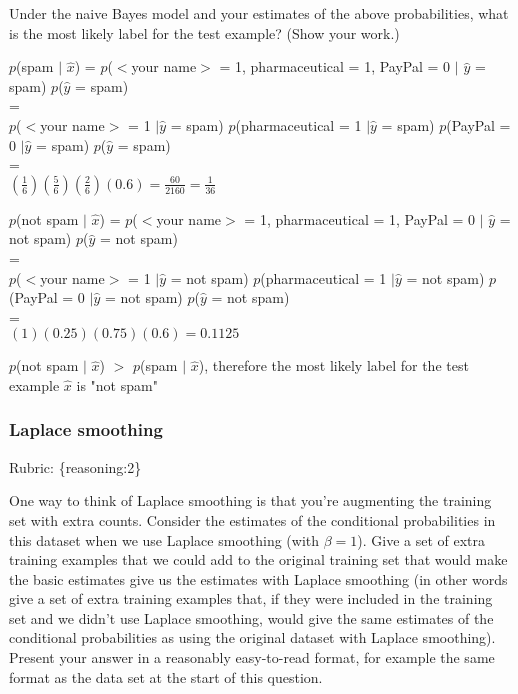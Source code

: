 \documentclass{article}
\def\rubric#1{\gre{Rubric: \{#1\}}}{}
\def\blu#1{{\color{blu}#1}}
\def\gre#1{{\color{gre}#1}}
\def\ans#1{{\color{ans}#1}}
\begin{document}
\blu{Under the naive Bayes model and your estimates of the above probabilities, what is the most likely label for the test example? (Show your work.)} 
\ans{
   \begin{center}
      $p$(spam $|$ $ \hat{x}$) = $p$($<$your name$>$ = 1, pharmaceutical = 1, PayPal = 0 $|$ $ \hat{y}$ = spam) $p$($\hat{y}$ = spam) \\ = \\ 
      $p$($<$your name$>$ = 1 $| \hat{y}$ = spam) $p$(pharmaceutical = 1 $| \hat{y}$ = spam) $p$(PayPal = 0 $| \hat{y}$ = spam) $p$($\hat{y}$ = spam) \\ = \\
      $(\frac{1}{6}) (\frac{5}{6}) (\frac{2}{6}) (0.6) = \frac{60}{2160} = \frac{1}{36}$
   \end{center}
   \begin{center}
      \fbox{$p$(spam $|$ $ \hat{x}$) = $\frac{1}{36} \approx 0.02778$}
   \end{center}
   \begin{center}
      $p$(not spam $|$ $ \hat{x}$) = $p$($<$your name$>$ = 1, pharmaceutical = 1, PayPal = 0 $|$ $ \hat{y}$ = not spam) $p$($\hat{y}$ = not spam) \\ = \\ 
      $p$($<$your name$>$ = 1 $| \hat{y}$ = not spam) $p$(pharmaceutical = 1 $| \hat{y}$ = not spam) $p$(PayPal = 0 $| \hat{y}$ = not spam) $p$($\hat{y}$ = not spam) \\ = \\
      $(1) (0.25) (0.75) (0.6) = 0.1125$
   \end{center}
   \begin{center}
      \fbox{$p$(not spam $|$ $ \hat{x}$) = $0.1125$}
   \end{center} 
   $p$(not spam $|$ $ \hat{x}$) $>$ $p$(spam $|$ $ \hat{x}$), therefore the most likely label for the 
   test example $\hat{x}$ is "not spam"
}
\subsubsection{Laplace smoothing}
\label{laplace.conceptual}
\rubric{reasoning:2}

One way to think of Laplace smoothing is that you're augmenting the training set with extra counts. Consider the estimates of the conditional probabilities in this dataset when we use Laplace smoothing (with $\beta = 1$). 
\blu{Give a set of extra training examples that we could add to the original training set that would make the basic estimates give us the estimates with Laplace smoothing} (in other words give a set of extra training examples that, if they were included in the training set and we didn't use Laplace smoothing, would give the same estimates of the conditional probabilities as using the original dataset with Laplace smoothing).
Present your answer in a reasonably easy-to-read format, for example the same format as the data set at the start of this question.
\end{document}
